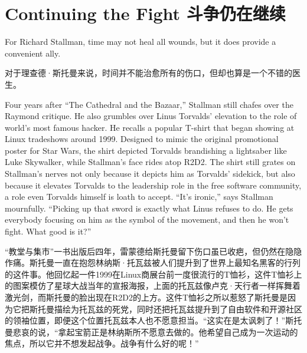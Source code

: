

\chapter{\ifdefined\eng
Continuing the Fight
\fi
\ifdefined\chs
斗争仍在继续
\fi}

\ifdefined\eng
For Richard Stallman, time may not heal all wounds, but it does provide a convenient ally.
\fi

\ifdefined\chs
对于理查德·斯托曼来说，时间并不能治愈所有的伤口，但却也算是一个不错的医生。
\fi

\ifdefined\eng
Four years after ``The Cathedral and the Bazaar,'' Stallman still chafes over the Raymond critique. He also grumbles over Linus Torvalds' elevation to the role of world's most famous hacker. He recalls a popular T-shirt that began showing at Linux tradeshows around 1999. Designed to mimic the original promotional poster for Star Wars, the shirt depicted Torvalds brandishing a lightsaber like Luke Skywalker, while Stallman's face rides atop R2D2. The shirt still grates on Stallman's nerves not only because it depicts him as Torvalds' sidekick, but also because it elevates Torvalds to the leadership role in the free software community, a role even Torvalds himself is loath to accept. ``It's ironic,'' says Stallman mournfully. ``Picking up that sword is exactly what Linus refuses to do. He gets everybody focusing on him as the symbol of the movement, and then he won't fight. What good is it?''
\fi

\ifdefined\chs
“教堂与集市”一书出版后四年，雷蒙德给斯托曼留下伤口虽已收疤，但仍然在隐隐作痛。斯托曼一直在抱怨林纳斯·托瓦兹被人们提升到了世界上最知名黑客的行列的这件事。他回忆起一件1999在Linux商展台前一度很流行的T恤衫，这件T恤衫上的图案模仿了星球大战当年的宣报海报，上面的托瓦兹像卢克·天行者一样挥舞着激光剑，而斯托曼的脸出现在R2D2的上方。这件T恤衫之所以惹怒了斯托曼是因为它把斯托曼描绘为托瓦兹的死党，同时还把托瓦兹提升到了自由软件和开源社区的领袖位置，即便这个位置托瓦兹本人也不愿意担当。“这实在是太讽刺了！”斯托曼悲哀的说，“拿起宝箭正是林纳斯所不愿意去做的。他希望自己成为一次运动的焦点，所以它并不想发起战争。战争有什么好的呢！”
\fi

